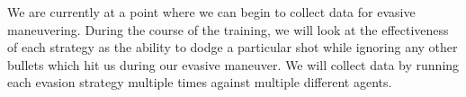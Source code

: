 \documentclass{article}
\theoremstyle{plain}
\theoremstyle{definition}
\theoremstyle{remark}
\begin{document}
We are currently at a point where we can begin to collect data for evasive maneuvering. During the course of the training, we will look at the effectiveness of each strategy as the ability to dodge a particular shot while ignoring any other bullets which hit us during our evasive maneuver. We will collect data by running each evasion strategy multiple times against multiple different agents. 

%
%
%
%
%
\end{document}
